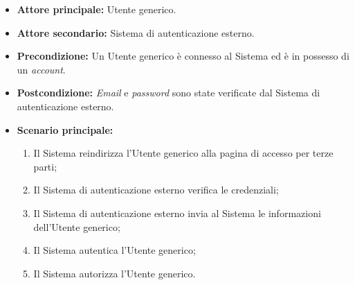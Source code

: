 \label{usecase:Effettua accesso per terze parti}
\begin{itemize}

	\item \textbf{Attore principale:} Utente generico.
	\item \textbf{Attore secondario:} Sistema di autenticazione esterno.

	\item \textbf{Precondizione:} Un Utente generico è connesso al Sistema ed è in possesso di un \textit{account}.

	\item \textbf{Postcondizione:} \textit{Email} e \textit{password} sono state verificate dal Sistema di autenticazione esterno.

	\item \textbf{Scenario principale:}
	\begin{enumerate}
		\item Il Sistema reindirizza l'Utente generico alla pagina di accesso per terze parti;
		\item Il Sistema di autenticazione esterno verifica le credenziali;
		\item Il Sistema di autenticazione esterno invia al Sistema le informazioni dell'Utente generico;
		\item Il Sistema autentica l'Utente generico;
		\item Il Sistema autorizza l'Utente generico.
	\end{enumerate}
	
\end{itemize}